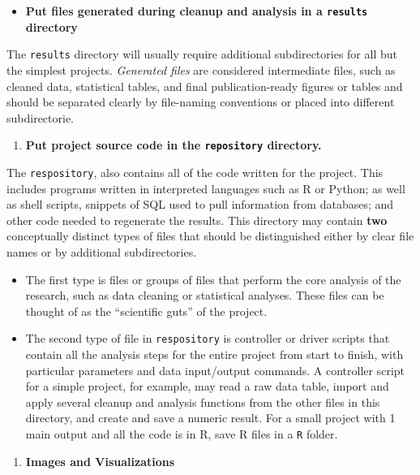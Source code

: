 \documentclass[
]{book}
\providecommand{\tightlist}{%
  \setlength{\itemsep}{0pt}\setlength{\parskip}{0pt}}
\begin{document}
\begin{itemize}
\tightlist
\item
  \textbf{Put files generated during cleanup and analysis in a \texttt{results} directory}
\end{itemize}

The \texttt{results} directory will usually require additional subdirectories for all but the simplest projects. \emph{Generated files} are considered intermediate files, such as cleaned data, statistical tables, and final publication-ready figures or tables and should be separated clearly by file-naming conventions or placed into different subdirectorie.

\begin{enumerate}
\def\labelenumi{\arabic{enumi}.}
\setcounter{enumi}{3}
\tightlist
\item
  \textbf{Put project source code in the \texttt{repository} directory.}
\end{enumerate}

The \texttt{respository}, also contains all of the code written for the project. This includes programs written in interpreted languages such as R or Python; as well as shell scripts, snippets of SQL used to pull information from databases; and other code needed to regenerate the results.
This directory may contain \textbf{two} conceptually distinct types of files that should be distinguished either by clear file names or by additional subdirectories.

\begin{itemize}
\tightlist
\item
  The first type is files or groups of files that perform the core analysis of the research, such as data cleaning or statistical analyses. These files can be thought of as the ``scientific guts'' of the project.
\item
  The second type of file in \texttt{respository} is controller or driver scripts that contain all the analysis steps for the entire project from start to finish, with particular parameters and data input/output commands. A controller script for a simple project, for example, may read a raw data table, import and apply several cleanup and analysis functions from the other files in this directory, and create and save a numeric result. For a small project with 1 main output and all the code is in R, save R files in a \texttt{R} folder.
\end{itemize}

\begin{enumerate}
\def\labelenumi{\arabic{enumi}.}
\setcounter{enumi}{4}
\tightlist
\item
  \textbf{Images and Visualizations}
\end{enumerate}
\end{document}
